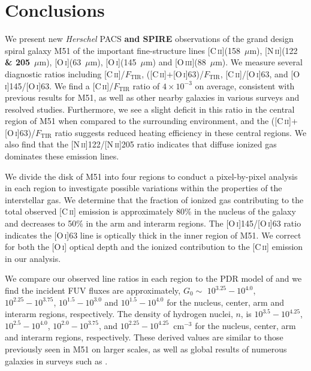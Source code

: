 \documentclass[preprint2]{aastex}
\begin{document}
\section{Conclusions}\label{conclusions}
We present new \emph{Herschel} PACS \textbf{and SPIRE} observations of the grand design spiral galaxy M51 of the important fine-structure lines [C\,\textsc{ii}](158~$\mu$m), [N\,\textsc{ii}](122 \textbf{\& 205}~$\mu$m), [O\,\textsc{i}](63~$\mu$m), [O\,\textsc{i}](145~$\mu$m) and [O\,\textsc{iii}](88~$\mu$m).  We measure several diagnostic ratios including [C\,\textsc{ii}]/$F_{\mathrm{TIR}}$, ([C\,\textsc{ii}]+[O\,\textsc{i}]63)/$F_{\mathrm{TIR}}$, [C\,\textsc{ii}]/[O\,\textsc{i}]63, and [O\,\textsc{i}]145/[O\,\textsc{i}]63.  We find a [C\,\textsc{ii}]/$F_{\mathrm{TIR}}$ ratio of $4 \times 10^{-3}$ on average, consistent with previous results for M51, as well as other nearby galaxies in various surveys and resolved studies.  Furthermore, we see a slight deficit in this ratio in the central region of M51 when compared to the surrounding environment, and the ([C\,\textsc{ii}]+[O\,\textsc{i}]63)/$F_{\mathrm{TIR}}$ ratio suggests reduced heating efficiency in these central regions.  We also find that the [N\,\textsc{ii}]122/[N\,\textsc{ii}]205 ratio indicates that diffuse ionized gas dominates these emission lines.

We divide the disk of M51 into four regions to conduct a pixel-by-pixel analysis in each region to investigate possible variations within the properties of the interstellar gas.  We determine that the fraction of ionized gas contributing to the total observed [C\,\textsc{ii}] emission is approximately 80\% in the nucleus of the galaxy and decreases to 50\% in the arm and interarm regions.  The [O\,\textsc{i}]145/[O\,\textsc{i}]63 ratio indicates the [O\,\textsc{i}]63 line is optically thick in the inner region of M51.  We correct for both the [O\,\textsc{i}] optical depth and the ionized contribution to the [C\,\textsc{ii}] emission in our analysis.

We compare our observed line ratios in each region to the PDR model of \citet{1999ApJ...527..795K} and we find the incident FUV fluxes are approximately, $G_{0}\sim$ $10^{3.25}-10^{4.0}$, $10^{2.25}-10^{3.75}$, $10^{1.5}-10^{3.0}$ and $10^{1.5}-10^{4.0}$ for the nucleus, center, arm and interarm regions, respectively.  The density of hydrogen nuclei, $n$, is $10^{3.5}-10^{4.25}$, $10^{2.5}-10^{4.0}$, $10^{2.0}-10^{3.75}$, and $10^{2.25}-10^{4.25}$~cm$^{-3}$ for the nucleus, center, arm and interarm regions, respectively.  These derived values are similar to those previously seen in M51 on larger scales, as well as global results of numerous galaxies in surveys such as \citet{2001ApJ...561..766M}.
\end{document}
